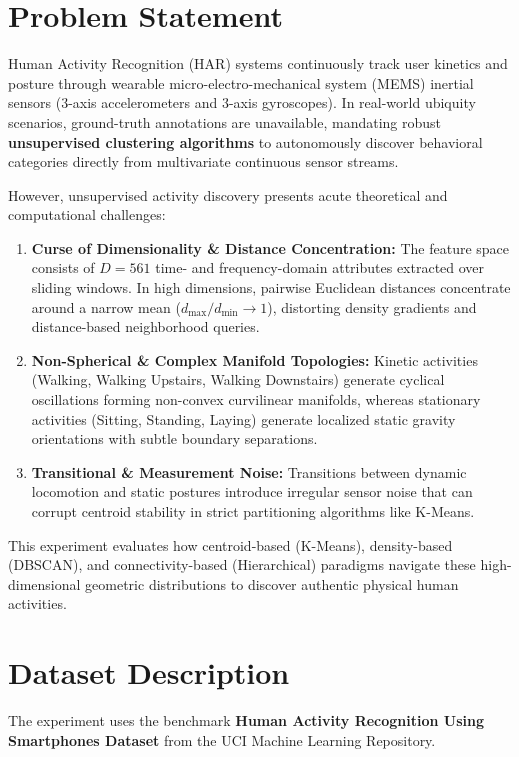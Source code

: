 \documentclass[12pt,a4paper]{article}
\begin{document}
\section{Problem Statement}
Human Activity Recognition (HAR) systems continuously track user kinetics and posture through wearable micro-electro-mechanical system (MEMS) inertial sensors (3-axis accelerometers and 3-axis gyroscopes). In real-world ubiquity scenarios, ground-truth annotations are unavailable, mandating robust \textbf{unsupervised clustering algorithms} to autonomously discover behavioral categories directly from multivariate continuous sensor streams.

However, unsupervised activity discovery presents acute theoretical and computational challenges:
\begin{enumerate}[noitemsep]
    \item \textbf{Curse of Dimensionality \& Distance Concentration:} The feature space consists of $D = 561$ time- and frequency-domain attributes extracted over sliding windows. In high dimensions, pairwise Euclidean distances concentrate around a narrow mean ($d_{\max} / d_{\min} \to 1$), distorting density gradients and distance-based neighborhood queries.
    \item \textbf{Non-Spherical \& Complex Manifold Topologies:} Kinetic activities (Walking, Walking Upstairs, Walking Downstairs) generate cyclical oscillations forming non-convex curvilinear manifolds, whereas stationary activities (Sitting, Standing, Laying) generate localized static gravity orientations with subtle boundary separations.
    \item \textbf{Transitional \& Measurement Noise:} Transitions between dynamic locomotion and static postures introduce irregular sensor noise that can corrupt centroid stability in strict partitioning algorithms like K-Means.
\end{enumerate}
This experiment evaluates how centroid-based (K-Means), density-based (DBSCAN), and connectivity-based (Hierarchical) paradigms navigate these high-dimensional geometric distributions to discover authentic physical human activities.

\section{Dataset Description}
The experiment uses the benchmark \textbf{Human Activity Recognition Using Smartphones Dataset} from the UCI Machine Learning Repository.
\end{document}

